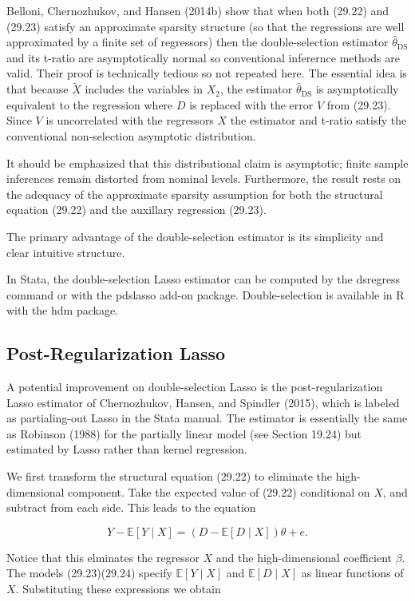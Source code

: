 \documentclass[10pt]{article}
\begin{document}
Belloni, Chernozhukov, and Hansen (2014b) show that when both (29.22) and (29.23) satisfy an approximate sparsity structure (so that the regressions are well approximated by a finite set of regressors) then the double-selection estimator $\widehat{\theta}_{\mathrm{DS}}$ and its t-ratio are asymptotically normal so conventional inferernce methods are valid. Their proof is technically tedious so not repeated here. The essential idea is that because $\tilde{X}$ includes the variables in $X_{2}$, the estimator $\widehat{\theta}_{\mathrm{DS}}$ is asymptotically equivalent to the regression where $D$ is replaced with the error $V$ from (29.23). Since $V$ is uncorrelated with the regressors $X$ the estimator and t-ratio satisfy the conventional non-selection asymptotic distribution.

It should be emphasized that this distributional claim is asymptotic; finite sample inferences remain distorted from nominal levels. Furthermore, the result rests on the adequacy of the approximate sparsity assumption for both the structural equation (29.22) and the auxillary regression (29.23).

The primary advantage of the double-selection estimator is its simplicity and clear intuitive structure.

In Stata, the double-selection Lasso estimator can be computed by the dsregress command or with the pdslasso add-on package. Double-selection is available in $\mathrm{R}$ with the hdm package.

\subsection{Post-Regularization Lasso}
A potential improvement on double-selection Lasso is the post-regularization Lasso estimator of Chernozhukov, Hansen, and Spindler (2015), which is labeled as partialing-out Lasso in the Stata manual. The estimator is essentially the same as Robinson (1988) for the partially linear model (see Section 19.24) but estimated by Lasso rather than kernel regression.

We first transform the structural equation (29.22) to eliminate the high-dimensional component. Take the expected value of (29.22) conditional on $X$, and subtract from each side. This leads to the equation

$$
Y-\mathbb{E}[Y \mid X]=(D-\mathbb{E}[D \mid X]) \theta+e .
$$

Notice that this elminates the regressor $X$ and the high-dimensional coefficient $\beta$. The models (29.23)(29.24) specify $\mathbb{E}[Y \mid X]$ and $\mathbb{E}[D \mid X]$ as linear functions of $X$. Substituting these expressions we obtain
\end{document}

